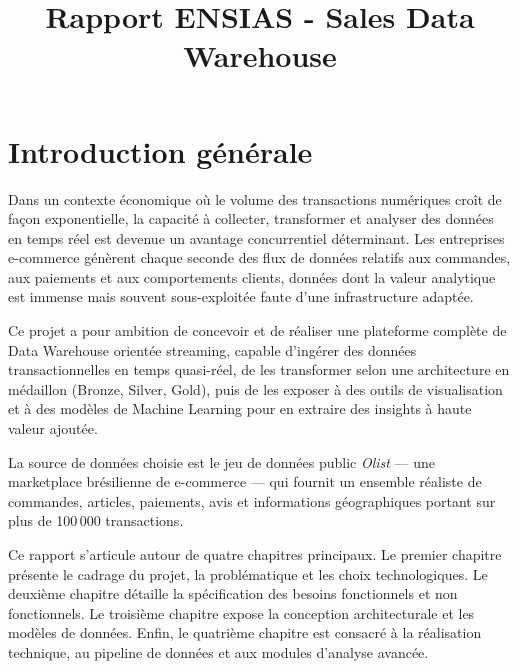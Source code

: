 \documentclass{rapportENSIAS}
\title{Rapport ENSIAS - Sales Data Warehouse}
\begin{document}




\jury{}


\fairemarges
\fairepagedegarde

\newpage
\chapter*{Introduction générale}
\vspace{3cm}

Dans un contexte économique où le volume des transactions numériques croît de façon exponentielle, la capacité à collecter, transformer et analyser des données en temps réel est devenue un avantage concurrentiel déterminant. Les entreprises e-commerce génèrent chaque seconde des flux de données relatifs aux commandes, aux paiements et aux comportements clients, données dont la valeur analytique est immense mais souvent sous-exploitée faute d'une infrastructure adaptée.

Ce projet a pour ambition de concevoir et de réaliser une plateforme complète de Data Warehouse orientée streaming, capable d'ingérer des données transactionnelles en temps quasi-réel, de les transformer selon une architecture en médaillon (Bronze, Silver, Gold), puis de les exposer à des outils de visualisation et à des modèles de Machine Learning pour en extraire des insights à haute valeur ajoutée.

La source de données choisie est le jeu de données public \textit{Olist} — une marketplace brésilienne de e-commerce — qui fournit un ensemble réaliste de commandes, articles, paiements, avis et informations géographiques portant sur plus de 100\,000 transactions.

Ce rapport s'articule autour de quatre chapitres principaux. Le premier chapitre présente le cadrage du projet, la problématique et les choix technologiques. Le deuxième chapitre détaille la spécification des besoins fonctionnels et non fonctionnels. Le troisième chapitre expose la conception architecturale et les modèles de données. Enfin, le quatrième chapitre est consacré à la réalisation technique, au pipeline de données et aux modules d'analyse avancée.
\end{document}
